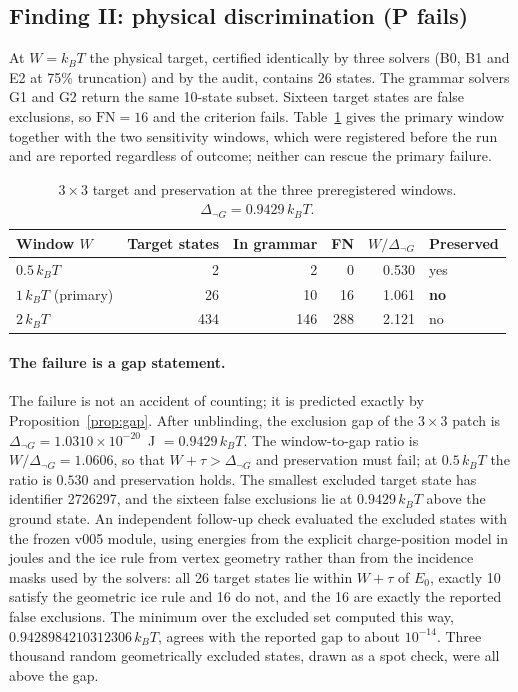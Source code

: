 \documentclass[11pt,a4paper]{article}
\theoremstyle{plain}
\theoremstyle{definition}
\theoremstyle{remark}
\newcommand{\dnG}{\Delta_{\neg G}}
\newcommand{\kBT}{k_{B}T}
\newcommand{\Eo}{E_{0}}
\begin{document}
\subsection{Finding II: physical discrimination (P fails)}
At $W=\kBT$ the physical target, certified identically by three solvers (B0, B1 and E2 at 75\% truncation) and by the audit, contains 26 states. The grammar solvers G1 and G2 return the same 10-state subset. Sixteen target states are false exclusions, so $\mathrm{FN}=16$ and the criterion fails. Table~\ref{tab:windows} gives the primary window together with the two sensitivity windows, which were registered before the run and are reported regardless of outcome; neither can rescue the primary failure.

\begin{table}[t]
\centering\small
\caption{$3\times3$ target and preservation at the three preregistered windows. $\Delta_{\neg G}=0.9429\,\kBT$.}
\label{tab:windows}
\begin{tabular}{@{}lrrrrl@{}}
\toprule
Window $W$ & Target states & In grammar & FN & $W/\Delta_{\neg G}$ & Preserved\\
\midrule
$0.5\,\kBT$ & 2 & 2 & 0 & 0.530 & yes\\
$1\,\kBT$ (primary) & 26 & 10 & 16 & 1.061 & \textbf{no}\\
$2\,\kBT$ & 434 & 146 & 288 & 2.121 & no\\
\bottomrule
\end{tabular}
\end{table}

\paragraph{The failure is a gap statement.}
The failure is not an accident of counting; it is predicted exactly by Proposition~\ref{prop:gap}. After unblinding, the exclusion gap of the $3\times3$ patch is $\dnG=1.0310\times10^{-20}$~J $=0.9429\,\kBT$. The window-to-gap ratio is $W/\dnG=1.0606$, so that $W+\tau>\dnG$ and preservation must fail; at $0.5\,\kBT$ the ratio is $0.530$ and preservation holds. The smallest excluded target state has identifier 2726297, and the sixteen false exclusions lie at $0.9429\,\kBT$ above the ground state. An independent follow-up check evaluated the excluded states with the frozen v005 module, using energies from the explicit charge-position model in joules and the ice rule from vertex geometry rather than from the incidence masks used by the solvers: all 26 target states lie within $W+\tau$ of $\Eo$, exactly 10 satisfy the geometric ice rule and 16 do not, and the 16 are exactly the reported false exclusions. The minimum over the excluded set computed this way, $0.9428984210312306\,\kBT$, agrees with the reported gap to about $10^{-14}$. Three thousand random geometrically excluded states, drawn as a spot check, were all above the gap.
\end{document}
